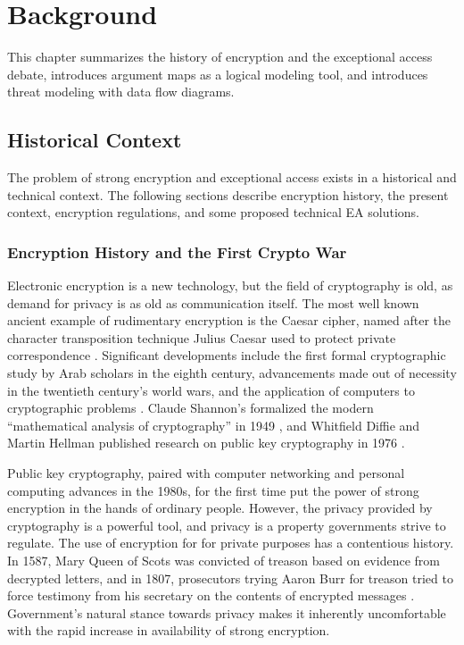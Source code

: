 \chapter{Background}
\label{chap-background}

This chapter summarizes the history of encryption and the exceptional access debate, introduces argument maps as a
logical modeling tool, and introduces threat modeling with data flow diagrams.

\section{Historical Context}
\label{sec-history}

The problem of strong encryption and exceptional access exists in a historical and technical context. The following
sections describe encryption history, the present context, encryption regulations, and some proposed technical \ac{EA}
solutions.

\subsection{Encryption History and the First Crypto War}
\label{sec-crypto-cwi}

Electronic encryption is a new technology, but the field of cryptography is old, as demand for privacy is as old as
communication itself. The most well known ancient example of rudimentary encryption is the Caesar cipher, named after
the character transposition technique Julius Caesar used to protect private correspondence
\cite{luciano_cryptology_1987}. Significant developments include the first formal cryptographic study by Arab scholars
in the eighth century, advancements made out of necessity in the twentieth century's world wars, and the application of
computers to cryptographic problems \cite{kahn_codebreakers_1996}. Claude Shannon's formalized the modern ``mathematical
analysis of cryptography'' in 1949 \cite{shannon_communication_1949}, and Whitfield Diffie and Martin Hellman published
research on public key cryptography in 1976 \cite{diffie_new_1976}.

Public key cryptography, paired with computer networking and personal computing advances in the 1980s, for the first
time put the power of strong encryption in the hands of ordinary people. However, the privacy provided by cryptography
is a powerful tool, and privacy is a property governments strive to regulate. The use of encryption for for private
purposes has a contentious history. In 1587, Mary Queen of Scots was convicted of treason based on evidence from
decrypted letters, and in 1807, prosecutors trying Aaron Burr for treason tried to force testimony from his secretary on
the contents of encrypted messages \cite{kerr_encryption_2017}. Government's natural stance towards privacy makes it
inherently uncomfortable with the rapid increase in availability of strong encryption.

